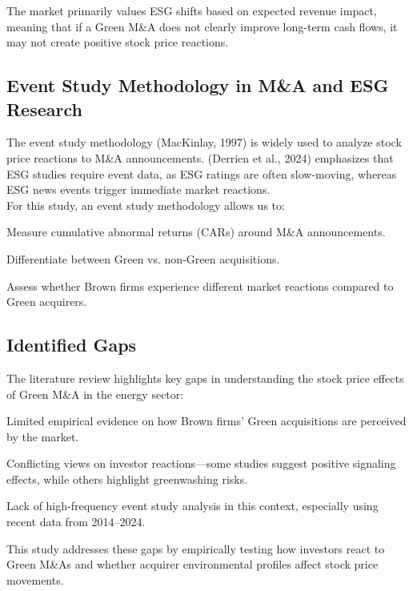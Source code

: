\documentclass[a4paper]{article}
\begin{document}
\textbullet The market primarily values ESG shifts based on expected revenue impact, meaning that if a Green M\&A does not clearly improve long-term cash flows, it may not create positive stock price reactions.

\subsection{Event Study Methodology in M\&A and ESG Research}
The event study methodology (MacKinlay, 1997) \autocite{mackinlay1997} is widely used to analyze stock price reactions to M\&A announcements. (Derrien et al., 2024)\autocite{derrien2024} emphasizes that ESG studies require event data, as ESG ratings are often slow-moving, whereas ESG news events trigger immediate market reactions.
\\
For this study, an event study methodology allows us to:

\textbullet Measure cumulative abnormal returns (CARs) around M\&A announcements.

\textbullet Differentiate between Green vs. non-Green acquisitions.

\textbullet Assess whether Brown firms experience different market reactions compared to Green acquirers.

\subsection{Identified Gaps}
The literature review highlights key gaps in understanding the stock price effects of Green M\&A in the energy sector:

\textbullet Limited empirical evidence on how Brown firms' Green acquisitions are perceived by the market.

\textbullet Conflicting views on investor reactions—some studies suggest positive signaling effects, while others highlight greenwashing risks.

\textbullet Lack of high-frequency event study analysis in this context, especially using recent data from 2014–2024.

This study addresses these gaps by empirically testing how investors react to Green M\&As and whether acquirer environmental profiles affect stock price movements.
\end{document}
